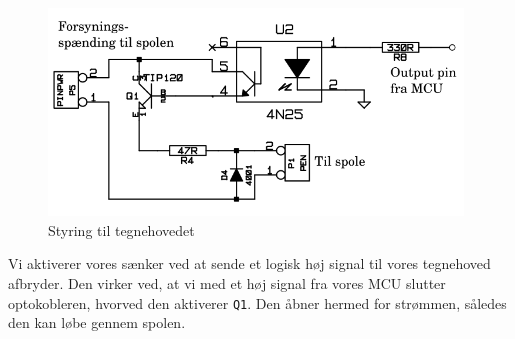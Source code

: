 \begin{figure}[htbp]
  \centering
  \includegraphics[width=11cm]{./img/tegnehoved-diagram}
  \caption{Styring til tegnehovedet}
  \label{fig:tegnehoved-diagram}
\end{figure}

Vi aktiverer vores sænker ved at sende et logisk høj signal til vores
tegnehoved afbryder. Den virker ved, at vi med et høj signal fra vores
MCU slutter optokobleren, hvorved den aktiverer \texttt{Q1}. Den åbner
hermed for strømmen, således den kan løbe gennem spolen.


